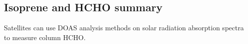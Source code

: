 \subsection{Isoprene and HCHO summary}


Satellites can use DOAS analysis methods on solar radiation absorption spectra to measure column HCHO.
  